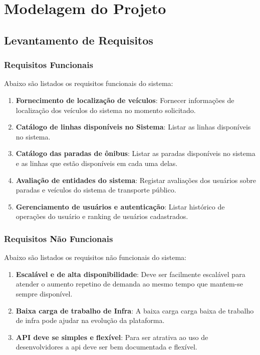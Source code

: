 \chapter{Modelagem do Projeto} \label{cha:modelagem}

\section{Levantamento de Requisitos}

\subsection{Requisitos Funcionais}
  Abaixo são listados os requisitos funcionais do sistema: 

  \begin{enumerate}
    \item \textbf{Fornecimento de localização de veículos}: Fornecer informações de localização dos veículos do sistema no momento solicitado.
    \item \textbf{Catálogo de linhas disponíveis no Sistema}: Listar as linhas disponíveis no sistema.
    \item \textbf{Catálogo das paradas de ônibus}: Listar as paradas disponíveis no sistema e as linhas que estão disponíveis em cada uma delas.
    \item \textbf{Avaliação de entidades do sistema}: Registar avaliações dos usuários sobre paradas e veículos do sistema de transporte público.
    \item \textbf{Gerenciamento de usuários e autenticação}: Listar histórico de operações do usuário e ranking de usuários cadastrados.  
  \end{enumerate}

\subsection{Requisitos Não Funcionais}
  Abaixo são listados os requisitos não funcionais do sistema:

  \begin{enumerate}
    \item \textbf{Escalável e de alta disponibilidade}: Deve ser facilmente escalável para atender o aumento repetino de demanda ao mesmo tempo que mantem-se sempre disponível.
    \item \textbf{Baixa carga de trabalho de Infra}: A baixa carga carga baixa de trabalho de infra pode ajudar na evolução da plataforma. 
    \item \textbf{API deve se simples e flexível}: Para ser atrativa ao uso de desenvolvidores a api deve ser bem documentada e flexível.
  \end{enumerate}

